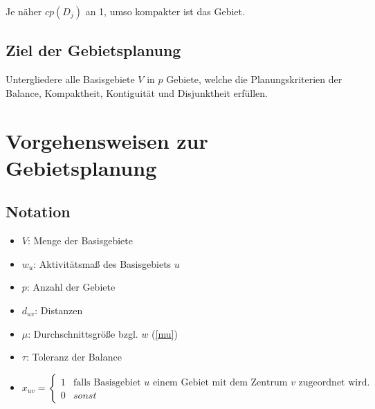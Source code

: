         Je näher $cp(D_j)$ an 1, umso kompakter ist das Gebiet.


    \subsection{Ziel der Gebietsplanung} %
    \label{sub:ziel_der_gebietsplanung}

      \par Untergliedere alle Basisgebiete $V$ in $p$ Gebiete, welche die Planungskriterien der Balance, Kompaktheit, Kontiguität und Disjunktheit erfüllen.
    
    
    

  \section{Vorgehensweisen zur Gebietsplanung} %
  \label{sec:vorgehensweisen_zur_gebietsplanung}

    \subsection{Notation} %
    \label{sub:notation}

      \begin{itemize}
        \item $V$: Menge der Basisgebiete
        \item $w_u$: Aktivitätsmaß des Basisgebiets $u$
        \item $p$: Anzahl der Gebiete
        \item $d_{uv}$: Distanzen
        \item $\mu$: Durchschnittsgröße bzgl. $w$ (\eqref{mu})
        \item $\tau$: Toleranz der Balance
        \item \begin{equation*}
                    x_{uv} = 
                    \begin{cases}
                      1 & \text{falls Basisgebiet } u \text{ einem Gebiet mit dem Zentrum } v \text{ zugeordnet wird.} \\
                      0 & sonst
                    \end{cases}
                \label{trivial wage scheme}
            \end{equation*}
      \end{itemize}
    
